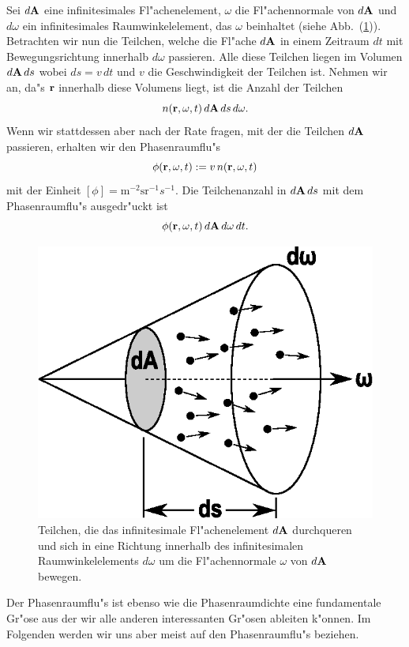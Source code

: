 \documentclass[11pt,a4paper,DIVcalc,BCOR8mm,titlepage,twoside]{scrartcl}
\begin{document}
	Sei $d\mathbf{A}$ eine infinitesimales Fl"achenelement, $\omega$ die Fl"achennormale von $d\mathbf{A}$ und $d\omega$ ein infinitesimales Raumwinkelelement, das $\omega$ beinhaltet (siehe Abb.~(\ref{fig:phasespacefluxsurface})). Betrachten wir nun die Teilchen, welche die Fl"ache $d\mathbf{A}$ in einem Zeitraum $dt$ mit Bewegungsrichtung innerhalb $d\omega$ passieren. Alle diese Teilchen liegen im Volumen $d\mathbf{A}\,ds$ wobei $ds=v\,dt$ und $v$ die Geschwindigkeit der Teilchen ist. Nehmen wir an, da"s $\mathbf{r}$ innerhalb diese Volumens liegt, ist die Anzahl der Teilchen $$n(\mathbf{r},\omega,t)\,d\mathbf{A}\,ds\,d\omega.$$ Wenn wir stattdessen aber nach der Rate fragen, mit der die Teilchen $d\mathbf{A}$ passieren, erhalten wir den Phasenraumflu"s $$\phi(\mathbf{r},\omega,t):=v\,n(\mathbf{r},\omega,t)$$ mit der Einheit $[\phi]=\text{m}^{-2}\text{sr}^{-1}s^{-1}$. Die Teilchenanzahl in $d\mathbf{A}\,ds$ mit dem Phasenraumflu"s ausgedr"uckt ist $$\phi(\mathbf{r},\omega,t)\,d\mathbf{A}\,d\omega\,dt.$$
	\begin{figure}
		\centering
		\includegraphics[height=0.3\textheight]{phasespacefluxsurface.eps}
		\caption{Teilchen, die das infinitesimale Fl"achenelement $d\mathbf{A}$ durchqueren und sich in eine Richtung innerhalb des infinitesimalen Raumwinkelelements $d\omega$ um die Fl"achennormale $\omega$ von $d\mathbf{A}$ bewegen.}
		\label{fig:phasespacefluxsurface}
	\end{figure}
	Der Phasenraumflu"s ist ebenso wie die Phasenraumdichte eine fundamentale Gr"ose aus der wir alle anderen interessanten Gr"osen ableiten k"onnen. Im Folgenden werden wir uns aber meist auf den Phasenraumflu"s beziehen.
		
\end{document}
